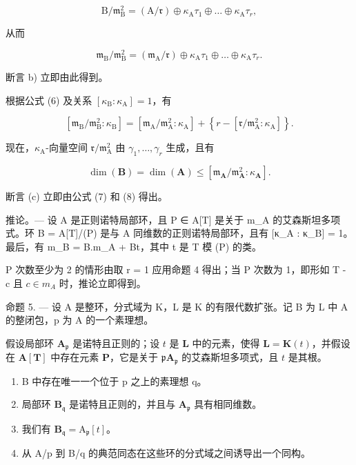 \[
\mathrm{B} / \mathfrak {m} _ {\mathrm{B}} ^ {2} = (\mathrm{A} / \mathfrak {r}) \oplus \kappa_ {\mathrm{A}} \tau_ {1} \oplus \dots \oplus \kappa_ {\mathrm{A}} \tau_ {r},\tag{5}
\]

从而

\[
\mathfrak {m} _ {\mathrm{B}} / \mathfrak {m} _ {\mathrm{B}} ^ {2} = (\mathfrak {m} _ {\mathrm{A}} / \mathfrak {r}) \oplus \kappa_ {\mathrm{A}} \tau_ {1} \oplus \dots \oplus \kappa_ {\mathrm{A}} \tau_ {r}.\tag{6}
\]

断言 b) 立即由此得到。

根据公式 (6) 及关系 \([\kappa_{\mathrm{B}}:\kappa_{\mathrm{A}}] = 1\)，有

\[
\left[ \mathfrak {m} _ {\mathrm{B}} / \mathfrak {m} _ {\mathrm{B}} ^ {2}: \kappa_ {\mathrm{B}} \right] = \left[ \mathfrak {m} _ {\mathrm{A}} / \mathfrak {m} _ {\mathrm{A}} ^ {2}: \kappa_ {\mathrm{A}} \right] + \left\{r - \left[ \mathfrak {r} / \mathfrak {m} _ {\mathrm{A}} ^ {2}: \kappa_ {\mathrm{A}} \right] \right\}.\tag{7}
\]

现在，\(\kappa_{\mathrm{A}}\)-向量空间 \(\mathfrak{r}/\mathfrak{m}_{\mathrm{A}}^{2}\) 由 \(\gamma_{1}, \ldots, \gamma_{r}\) 生成，且有

\[
\dim (\mathbf {B}) = \dim (\mathbf {A}) \leqslant [ \mathfrak {m} _ {\mathbf {A}} / \mathfrak {m} _ {\mathbf {A}} ^ {2}: \kappa_ {\mathbf {A}} ].\tag{8}
\]

断言 (c) 立即由公式 (7) 和 (8) 得出。

推论。--- 设 A 是正则诺特局部环，且 P ∈ A{[}T{]} 是关于 m\_A 的艾森斯坦多项式。环 B = A{[}T{]}/(P) 是与 A 同维数的正则诺特局部环，且有 {[}κ\_A : κ\_B{]} = 1。最后，有 m\_B = B.m\_A + Bt，其中 t 是 T 模 (P) 的类。

P 次数至少为 2 的情形由取 r = 1 应用命题 4 得出；当 P 次数为 1，即形如 T - c 且 \(c \in m_{A}\) 时，推论立即得到。

命题 5. --- 设 A 是整环，分式域为 K，L 是 K 的有限代数扩张。记 B 为 L 中 A 的整闭包，p 为 A 的一个素理想。

假设局部环 \(\mathbf{A}_{\mathfrak{p}}\) 是诺特且正则的；设 \(t\) 是 \(\mathbf{L}\) 中的元素，使得 \(\mathbf{L} = \mathbf{K}(t)\)，并假设在 \(\mathbf{A}[\mathbf{T}]\) 中存在元素 \(\mathbf{P}\)，它是关于 \(\mathfrak{p}\mathbf{A}_{\mathfrak{p}}\) 的艾森斯坦多项式，且 \(t\) 是其根。

\begin{enumerate}
\def\labelenumi{\alph{enumi})}
\item
  B 中存在唯一一个位于 p 之上的素理想 q。
\item
  局部环 \(\mathbf{B}_{\mathfrak{q}}\) 是诺特且正则的，并且与 \(\mathbf{A}_{\mathfrak{p}}\) 具有相同维数。
\item
  我们有 \(\mathbf{B}_{\mathfrak{q}} = \mathrm{A}_{\mathfrak{p}}[t]\)。
\item
  从 A/p 到 B/q 的典范同态在这些环的分式域之间诱导出一个同构。
\end{enumerate}

